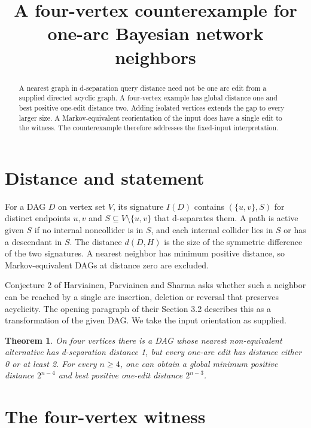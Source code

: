 \documentclass[11pt,a4paper]{amsart}
\title{A four-vertex counterexample for one-arc Bayesian network neighbors}
\date{}
\newtheorem{theorem}{Theorem}
\begin{document}
\begin{abstract}
A nearest graph in d-separation query distance need not be one
arc edit from a supplied directed acyclic graph. A four-vertex example has global
distance one and best positive one-edit distance two. Adding isolated
vertices extends the gap to every larger size. A Markov-equivalent
reorientation of the input does have a single edit to the witness.
The counterexample therefore addresses the fixed-input interpretation.
\end{abstract}
\maketitle

\section{Distance and statement}

For a DAG \(D\) on vertex set \(V\), its signature \(I(D)\)
contains \((\{u,v\},S)\) for distinct endpoints \(u,v\) and
\(S\subseteq V\setminus\{u,v\}\) that d-separates them.
A path is active given \(S\) if no internal noncollider is in
\(S\), and each internal collider lies in \(S\) or has a
descendant in \(S\). The distance \(d(D,H)\) is the size of the
symmetric difference of the two signatures. A nearest neighbor
has minimum positive distance, so Markov-equivalent DAGs at
distance zero are excluded.

Conjecture 2 of Harviainen, Parviainen and Sharma \cite[p.~2065]{hps}
asks whether such a neighbor can be reached by a single arc
insertion, deletion or reversal that preserves acyclicity. The
opening paragraph of their Section 3.2 describes this as a
transformation of the given DAG. We take the input orientation
as supplied.

\begin{theorem}
On four vertices there is a DAG whose nearest non-equivalent
alternative has d-separation distance 1, but every one-arc
edit has distance either 0 or at least 2.
For every \(n\ge4\), one can obtain a global minimum positive
distance \(2^{n-4}\) and best positive one-edit distance \(2^{n-3}\).
\end{theorem}

\section{The four-vertex witness}
\end{document}
